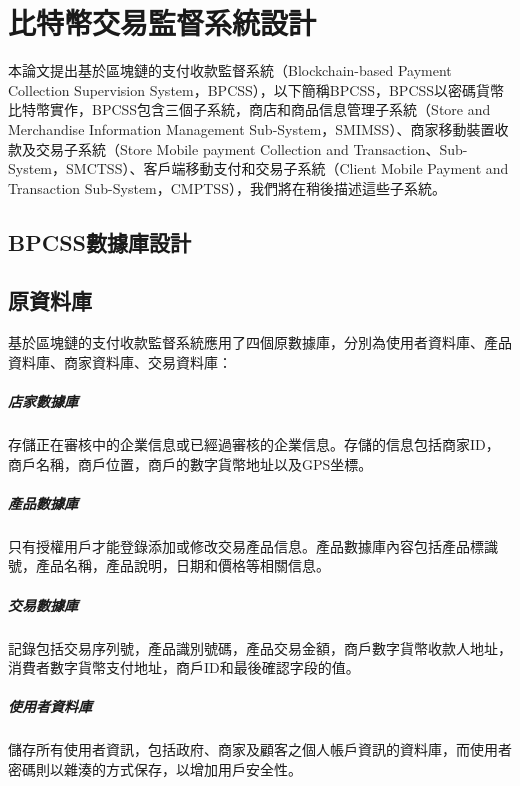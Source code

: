 
\chapter{比特幣交易監督系統設計}
本論文提出基於區塊鏈的支付收款監督系統（Blockchain-based Payment Collection Supervision System，BPCSS），以下簡稱BPCSS，BPCSS以密碼貨幣比特幣實作，BPCSS包含三個子系統，商店和商品信息管理子系統（Store and Merchandise Information Management Sub-System，SMIMSS）、商家移動裝置收款及交易子系統（Store Mobile payment Collection and Transaction、Sub-System，SMCTSS）、客戶端移動支付和交易子系統（Client Mobile Payment and Transaction Sub-System，CMPTSS），我們將在稍後描述這些子系統。

	\section{BPCSS數據庫設計}
		\section{原資料庫}
		基於區塊鏈的支付收款監督系統應用了四個原數據庫，分別為使用者資料庫、產品資料庫、商家資料庫、交易資料庫：

			\paragraph{店家數據庫}存儲正在審核中的企業信息或已經過審核的企業信息。存儲的信息包括商家ID，商戶名稱，商戶位置，商戶的數字貨幣地址以及GPS坐標。
			\paragraph{產品數據庫}只有授權用戶才能登錄添加或修改交易產品信息。產品數據庫內容包括產品標識號，產品名稱，產品說明，日期和價格等相關信息。
			\paragraph{交易數據庫}記錄包括交易序列號，產品識別號碼，產品交易金額，商戶數字貨幣收款人地址，消費者數字貨幣支付地址，商戶ID和最後確認字段的值。
			\paragraph{使用者資料庫}儲存所有使用者資訊，包括政府、商家及顧客之個人帳戶資訊的資料庫，而使用者密碼則以雜湊的方式保存，以增加用戶安全性。

